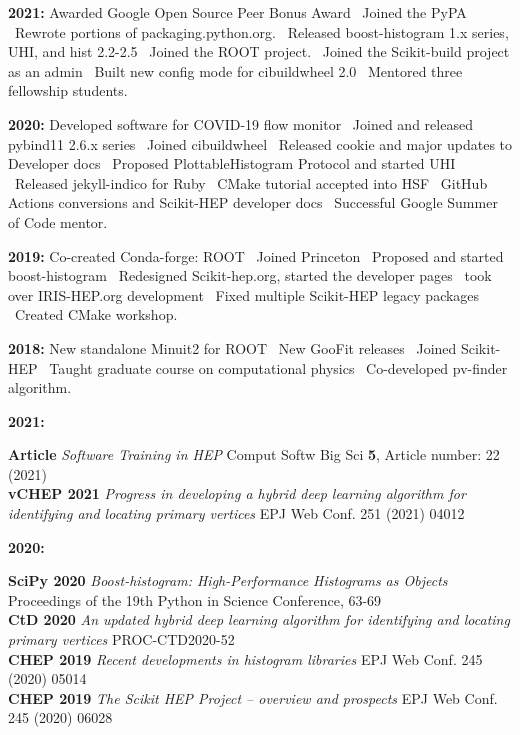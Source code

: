\documentclass[10pt,letterpaper]{moderncv}
\begin{document}

\textbf{2021:} Awarded Google Open Source Peer Bonus Award \textbullet\ Joined the PyPA \textbullet\ Rewrote portions of packaging.python.org. \textbullet\ Released boost-histogram 1.x series, UHI, and hist 2.2-2.5 \textbullet\ Joined the ROOT project. \textbullet\ Joined the Scikit-build project as an admin \textbullet\ Built new config mode for cibuildwheel 2.0 \textbullet\ Mentored three fellowship students.

\textbf{2020:} Developed software for COVID-19 flow monitor \textbullet\ Joined and released pybind11 2.6.x series \textbullet\ Joined cibuildwheel \textbullet\ Released cookie and major updates to Developer docs \textbullet\ Proposed PlottableHistogram Protocol and started UHI \textbullet\ Released jekyll-indico for Ruby \textbullet\ CMake tutorial accepted into HSF \textbullet\ GitHub Actions conversions and Scikit-HEP developer docs \textbullet\ Successful Google Summer of Code mentor.

\textbf{2019:} Co-created Conda-forge: ROOT \textbullet\ Joined Princeton \textbullet\ Proposed and started boost-histogram \textbullet\ Redesigned Scikit-hep.org, started the developer pages \textbullet\ took over IRIS-HEP.org development \textbullet\ Fixed multiple Scikit-HEP legacy packages \textbullet\ Created CMake workshop.

\textbf{2018:} New standalone Minuit2 for ROOT \textbullet\ New GooFit releases \textbullet\ Joined Scikit-HEP \textbullet\ Taught graduate course on computational physics \textbullet\ Co-developed pv-finder algorithm.


\begin{minipage}[t]{.065\textwidth}
\textbf{2021:}
\end{minipage}%
\begin{minipage}[t]{.935\textwidth}
\textbf{Article} \emph{Software Training in HEP} Comput Softw Big Sci \textbf{5}, Article number: 22 (2021) \\
\textbf{vCHEP 2021} \emph{Progress in developing a hybrid deep learning algorithm for identifying and locating primary vertices} EPJ Web Conf. 251 (2021) 04012
\end{minipage}

\begin{minipage}[t]{.065\textwidth}
\textbf{2020:}
\end{minipage}%
\begin{minipage}[t]{.935\textwidth}
\textbf{SciPy 2020} \emph{Boost-histogram: High-Performance Histograms as Objects} Proceedings of the 19th Python in Science Conference, 63-69 \\
\textbf{CtD 2020}   \emph{An updated hybrid deep learning algorithm for identifying and locating primary vertices} PROC-CTD2020-52 \\
\textbf{CHEP 2019}  \emph{Recent developments in histogram libraries} EPJ Web Conf. 245 (2020) 05014 \\
\textbf{CHEP 2019}  \emph{The Scikit HEP Project -- overview and prospects} EPJ Web Conf. 245 (2020) 06028
\end{minipage}
\end{document}
